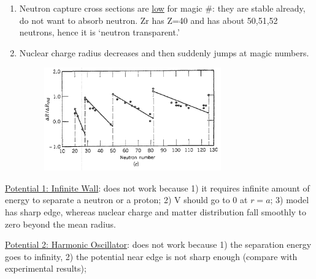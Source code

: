 \documentclass{school-22.101-notes}
\begin{document}
\begin{enumerate}
\begin{enumerate}
\item Neutron capture cross sections are \uline{low} for magic \#: they are stable already, do not want to absorb neutron. Zr has Z=40 and has about 50,51,52 neutrons, hence it is `neutron transparent.'
\item Nuclear charge radius decreases and then suddenly jumps at magic numbers. 
\begin{figure}[ht]
    \centering
    \includegraphics[width=3in]{images/shell/shell-evidence-5.png}
\end{figure}
\end{enumerate}
\end{enumerate}

\uline{Potential 1: Infinite Wall}: does not work because 1) it requires infinite amount of energy to separate a neutron or a proton; 2) V should go to $0$ at $r=a$; 3) model has sharp edge, whereas nuclear charge and matter distribution fall smoothly to zero beyond the mean radius. 

\uline{Potential 2: Harmonic Oscillator}: does not work because 1) the separation energy goes to infinity, 2) the potential near edge is not sharp enough (compare with experimental results);
\end{document}
